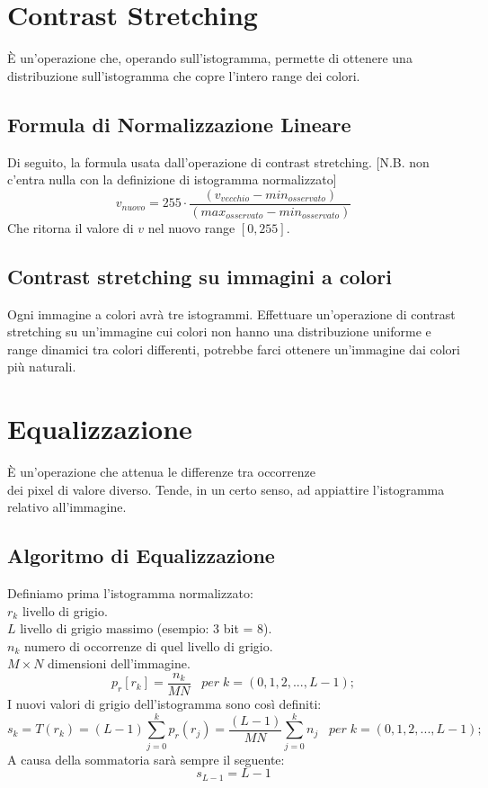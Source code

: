 \documentclass{report}
\begin{document}
	\section{Contrast Stretching}
	È un'operazione che, operando sull'istogramma, permette di ottenere una distribuzione sull'istogramma che copre l'intero range dei colori.
	\subsection{Formula di Normalizzazione Lineare}
	Di seguito, la formula usata dall'operazione di contrast stretching. [N.B. non c'entra nulla con la definizione di istogramma normalizzato]
	$$
	v_{nuovo} = 255 \cdot \frac{(v_{vecchio} - min_{osservato})}{(max_{osservato} - min_{osservato})}
	$$
	Che ritorna il valore di $v$ nel nuovo range $[0,255]$.
	\subsection{Contrast stretching su immagini a colori}
	Ogni immagine a colori avrà tre istogrammi.
	Effettuare un'operazione di contrast stretching su un'immagine cui colori non hanno una distribuzione uniforme e range dinamici tra colori differenti, potrebbe farci ottenere un'immagine dai colori più naturali.
	\section{Equalizzazione}
	È un'operazione che attenua le differenze tra occorrenze\\ dei pixel di valore diverso. Tende, in un certo senso, ad appiattire l'istogramma relativo all'immagine.
	\subsection{Algoritmo di Equalizzazione}
	Definiamo prima l'istogramma normalizzato:\\
	$r_k$ livello di grigio.\\
	$L$ livello di grigio massimo (esempio: 3 bit = 8).\\
	$n_k$ numero di occorrenze di quel livello di grigio.\\
	$M\times N$ dimensioni dell'immagine.
	$$
	p_r[r_k] = \frac{n_k}{MN} \;\;\; per \; k = (0, 1, 2,..., L-1);
	$$
	I nuovi valori di grigio dell'istogramma sono così definiti:
	$$
	s_k = T(r_k) = (L-1) \sum_{j = 0}^k p_r(r_j) =\frac{(L-1)}{MN}\sum_{j = 0}^k n_j \;\;\; per \; k = (0, 1, 2,..., L-1);
	$$
	A causa della sommatoria sarà sempre il seguente:
	$$
	s_{L-1} = L-1
	$$
	\newpage
		
\end{document}
